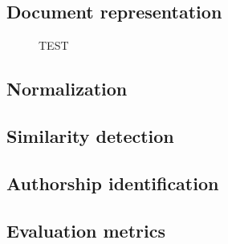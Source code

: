 \subsection{Document representation}


\begin{figure}[!h]
\centering
\setlength\figureheight{5cm}
\setlength\figurewidth{8cm}


\caption{TEST} \label{fig:M1}
\end{figure}

\subsection{Normalization}

\subsection{Similarity detection}


\subsection{Authorship identification}



\subsection{Evaluation metrics}